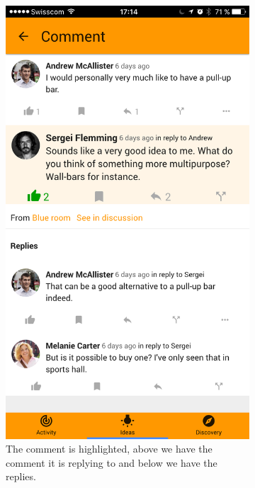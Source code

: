 \documentclass[a4paper,12pt,twoside]{article}
\begin{document}
\begin{figure}[!htb]
    \begin{subfigure}[t]{.48\textwidth}
        \centering
        \includegraphics[width=.67\textwidth]{images/commentView.png}
        \caption{The comment is highlighted, above we have the comment it is replying to and below we have the replies.}
        \label{fig.commentView}
    \end{subfigure}
    \hfill
    \begin{subfigure}[t]{.48\textwidth}
        \centering

\end{subfigure}
\end{figure}
\end{document}
